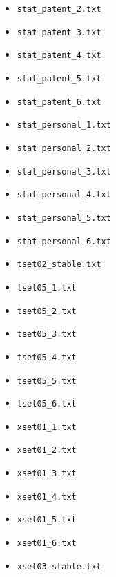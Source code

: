 \documentclass{article}
\begin{document}
\begin{itemize}
\item \texttt{stat\_patent\_2.txt}
\item \texttt{stat\_patent\_3.txt}
\item \texttt{stat\_patent\_4.txt}
\item \texttt{stat\_patent\_5.txt}
\item \texttt{stat\_patent\_6.txt}
\item \texttt{stat\_personal\_1.txt}
\item \texttt{stat\_personal\_2.txt}
\item \texttt{stat\_personal\_3.txt}
\item \texttt{stat\_personal\_4.txt}
\item \texttt{stat\_personal\_5.txt}
\item \texttt{stat\_personal\_6.txt}
\item \texttt{tset02\_stable.txt}
\item \texttt{tset05\_1.txt}
\item \texttt{tset05\_2.txt}
\item \texttt{tset05\_3.txt}
\item \texttt{tset05\_4.txt}
\item \texttt{tset05\_5.txt}
\item \texttt{tset05\_6.txt}
\item \texttt{xset01\_1.txt}
\item \texttt{xset01\_2.txt}
\item \texttt{xset01\_3.txt}
\item \texttt{xset01\_4.txt}
\item \texttt{xset01\_5.txt}
\item \texttt{xset01\_6.txt}
\item \texttt{xset03\_stable.txt}

\end{itemize}
\end{document}
